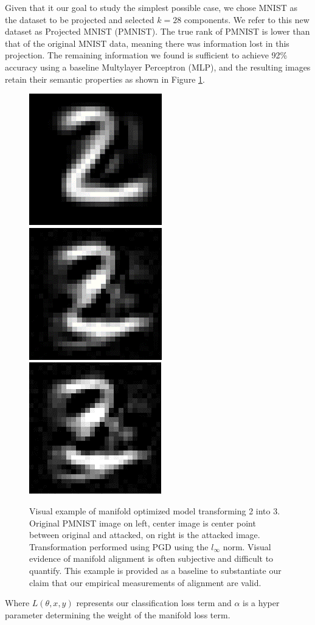 Given that it our goal to study the simplest possible case, we chose MNIST as the dataset to be projected and selected $k = 28$ components.
We refer to this new dataset as Projected MNIST (PMNIST).
The true rank of PMNIST is lower than that of the original MNIST data, meaning there was information lost in this projection.
The remaining information we found is sufficient to achieve 92\% accuracy using a baseline Multylayer Perceptron (MLP), and the resulting images retain their semantic properties as shown in Figure \ref{fig:perception}.

\begin{figure}
    \centering
    \includegraphics[width=0.25\linewidth]{c3_figures/pag_0.png}
    \includegraphics[width=0.25\linewidth]{c3_figures/pag_1.png}
    \includegraphics[width=0.25\linewidth]{c3_figures/pag_2.png}
    \caption{Visual example of manifold optimized model transforming 2 into 3. Original PMNIST image on left, center image is center point between original and attacked, on right is the attacked image. Transformation performed using PGD using the $l_\infty$ norm. Visual evidence of manifold alignment is often subjective and difficult to quantify. This example is provided as a baseline to substantiate our claim that our empirical measurements of alignment are valid.}
    \label{fig:perception}
\end{figure}

Where $L(\theta, x, y)$ represents our classification loss term and $\alpha$ is a hyper parameter determining the weight of the manifold loss term.

